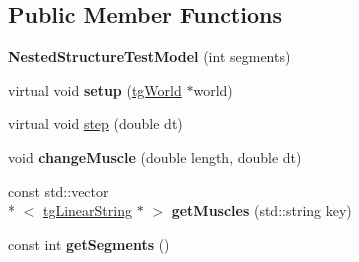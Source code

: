 \subsection*{Public Member Functions}
\begin{DoxyCompactItemize}
\item 
\hypertarget{class_nested_structure_test_model_ab6dd9c096f06948fb61570b26dbdd861}{{\bfseries Nested\-Structure\-Test\-Model} (int segments)}\label{class_nested_structure_test_model_ab6dd9c096f06948fb61570b26dbdd861}

\item 
\hypertarget{class_nested_structure_test_model_aa42a0b91e39f528ea60928fb98e25734}{virtual void {\bfseries setup} (\hyperlink{classtg_world}{tg\-World} $\ast$world)}\label{class_nested_structure_test_model_aa42a0b91e39f528ea60928fb98e25734}

\item 
virtual void \hyperlink{class_nested_structure_test_model_af670e0e83b05c97575e7ba96436652d4}{step} (double dt)
\item 
\hypertarget{class_nested_structure_test_model_af667ec40665e66fa632092c394b346aa}{void {\bfseries change\-Muscle} (double length, double dt)}\label{class_nested_structure_test_model_af667ec40665e66fa632092c394b346aa}

\item 
\hypertarget{class_nested_structure_test_model_aedb3e354ea05a5b91a3ea477ed861c2e}{const std\-::vector\\*
$<$ \hyperlink{classtg_linear_string}{tg\-Linear\-String} $\ast$ $>$ {\bfseries get\-Muscles} (std\-::string key)}\label{class_nested_structure_test_model_aedb3e354ea05a5b91a3ea477ed861c2e}

\item 
\hypertarget{class_nested_structure_test_model_a8d484a64e75f54164239eb0a427ca222}{const int {\bfseries get\-Segments} ()}\label{class_nested_structure_test_model_a8d484a64e75f54164239eb0a427ca222}


\end{DoxyCompactItemize}
